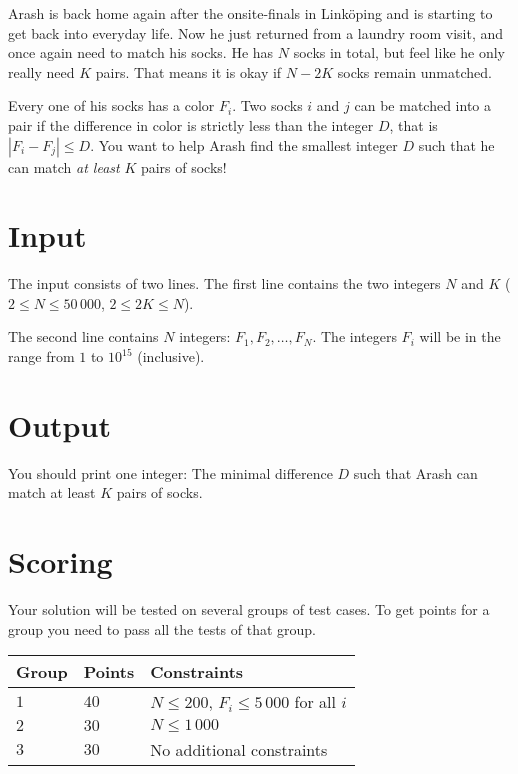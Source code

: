Arash is back home again after the onsite-finals in Linköping and is starting to get back into everyday life.
Now he just returned from a laundry room visit, and once again need to match his socks.
He has $N$ socks in total, but feel like he only really need $K$ pairs.
That means it is okay if $N-2K$ socks remain unmatched.

Every one of his socks has a color $F_i$. Two socks $i$ and $j$ can be matched into a pair
if the difference in color is strictly less than the integer $D$, that is $|F_i - F_j| \le D$.
You want to help Arash find the smallest integer $D$ such that he can match \textit{at least} $K$ pairs of socks!

\section*{Input}

The input consists of two lines.
The first line contains the two integers $N$ and $K$ ($2 \leq N \leq 50\,000$, $2 \leq 2K \leq N$).

The second line contains $N$ integers: $F_1, F_2, \dots, F_N$. The integers $F_i$ will be in the range from $1$
to $10^{15}$ (inclusive).

\section*{Output}

You should print one integer: The minimal difference $D$ such that Arash can match at least $K$ pairs of socks.


\section*{Scoring}
Your solution will be tested on several groups of test cases. To get points for a group you need to pass all the tests of that group.

\noindent
\begin{tabular}{| l | l | l |}
	\hline
	Group & Points & Constraints\\ \hline
 $1$    & $40$        & $N \leq 200$, $F_i \leq 5\,000$ for all $i$ \\ \hline
 $2$    & $30$        & $N \leq 1\,000$ \\ \hline
 $3$    & $30$        & No additional constraints \\ \hline
\end{tabular}
